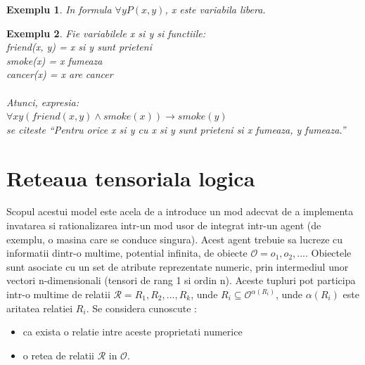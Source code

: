 \documentclass{article}
\newtheorem{example}{Exemplu}[section]
\begin{document}
\begin{example}
In formula $\forall yP(x, y)$, x este variabila libera.\cite{Free_Variable}
\end{example}

\begin{example}
Fie variabilele x si y si functiile:\\
friend(x, y) = x si y sunt prieteni\\
smoke(x) = x fumeaza\\
cancer(x) = x are cancer\\ \\
Atunci, expresia:\\
$\forall xy(friend(x,y) \land smoke(x)) \rightarrow smoke(y)$ \\
se citeste ``Pentru orice x si y cu x si y sunt prieteni si x fumeaza, y fumeaza.''
\end{example}

\section{Reteaua tensoriala logica}
Scopul acestui model este acela de a introduce un mod adecvat de a implementa invatarea si rationalizarea intr-un mod usor de integrat intr-un agent (de exemplu, o masina care se conduce singura). Acest agent trebuie sa lucreze cu informatii dintr-o multime, potential infinita, de obiecte $\mathcal{O} = {o_1, o_2, ...}$. Obiectele sunt asociate cu un set de atribute reprezentate numeric, prin intermediul unor vectori n-dimensionali (tensori de rang 1 si ordin n). Aceste tupluri pot participa intr-o multime de relatii $\mathcal{R} = {R_1, R_2, ..., R_k}$, unde $R_i \subseteq \mathcal{O}^{\alpha(R_i)}$, unde $\alpha(R_i)$ este aritatea relatiei $R_i$. Se considera cunoscute \cite{LTN}:\\
\begin{itemize}
	\item ca exista o relatie intre aceste proprietati numerice 
	\item o retea de relatii $\mathcal{R}$ in $\mathcal{O}$. 
\end{itemize}
\end{document}
